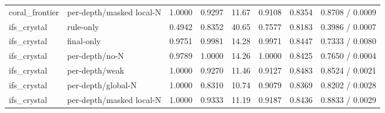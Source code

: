 \begin{table}[t]
{\begin{tabular}{llrrrrrr}
  coral\_frontier & per-depth/masked local-N & 1.0000 & 0.9297 & 11.67 & 0.9108 & 0.8354 & 0.8708 / 0.0009 \\
  ifs\_crystal & rule-only & 0.4942 & 0.8352 & 40.65 & 0.7577 & 0.8183 & 0.3986 / 0.0007 \\
  ifs\_crystal & final-only & 0.9751 & 0.9981 & 14.28 & 0.9971 & 0.8447 & 0.7333 / 0.0080 \\
  ifs\_crystal & per-depth/no-N & 0.9789 & 1.0000 & 14.26 & 1.0000 & 0.8425 & 0.7650 / 0.0004 \\
  ifs\_crystal & per-depth/weak & 1.0000 & 0.9270 & 11.46 & 0.9127 & 0.8483 & 0.8524 / 0.0021 \\
  ifs\_crystal & per-depth/global-N & 1.0000 & 0.8310 & 10.74 & 0.9079 & 0.8369 & 0.8202 / 0.0028 \\
  ifs\_crystal & per-depth/masked local-N & 1.0000 & 0.9333 & 11.19 & 0.9187 & 0.8436 & 0.8833 / 0.0029 \\
  \bottomrule
  \end{tabular}
  }
\end{table}
